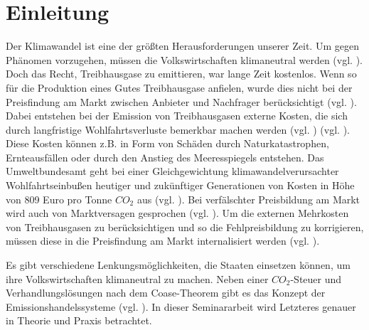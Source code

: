 \chapter{Einleitung}

Der Klimawandel ist eine der größten Herausforderungen unserer Zeit. Um gegen Phänomen vorzugehen, müssen die Volkswirtschaften klimaneutral werden (vgl. \cite[S. 162]{hubert.2020}).
Doch das Recht, Treibhausgase zu emittieren, war lange Zeit kostenlos. Wenn so für die Produktion eines Gutes Treibhausgase anfielen, wurde dies nicht bei der Preisfindung am Markt zwischen Anbieter und Nachfrager berücksichtigt (vgl. \cite[S. 161]{hubert.2020}).
Dabei entstehen bei der Emission von Treibhausgasen externe Kosten, die sich durch langfristige Wohlfahrtsverluste bemerkbar machen werden (vgl. \cite[S. 25]{rabe.2018}) (vgl. \cite{ub4.2023}).
Diese Kosten können z.B. in Form von Schäden durch Naturkatastrophen, Ernteausfällen oder durch den Anstieg des Meeresspiegels entstehen.
Das Umweltbundesamt geht bei einer Gleichgewichtung klimawandelverursachter Wohlfahrtseinbußen heutiger und zukünftiger Generationen von Kosten in Höhe von 809 Euro pro Tonne $CO_2$ aus (vgl. \cite{ub4.2023}).
Bei verfälschter Preisbildung am Markt wird auch von Marktversagen gesprochen (vgl. \cite[S. 268]{hubert.2019}).
Um die externen Mehrkosten von Treibhausgasen zu berücksichtigen und so die Fehlpreisbildung zu korrigieren, müssen diese in die Preisfindung am Markt internalisiert werden (vgl. \cite[S. 161]{hubert.2020}).

Es gibt verschiedene Lenkungsmöglichkeiten, die Staaten einsetzen können, um ihre Volkswirtschaften klimaneutral zu machen.
Neben einer $CO_2$-Steuer und Verhandlungslösungen nach dem Coase-Theorem gibt es das Konzept der Emissionshandelssysteme (vgl. \cite[S. 161]{hubert.2020}).
In dieser Seminararbeit wird Letzteres genauer in Theorie und Praxis betrachtet.